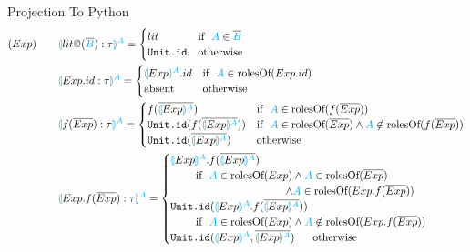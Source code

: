 \documentclass[11pt]{jarticle}
\newcommand{\projection}[2]{{\color{cyan}\llparenthesis}#1{\color{cyan}\rrparenthesis^#2}}
\newcommand{\gray}[1]{\textbf{\textsf{\color{Gray}#1}}}
\begin{document}
Projection To Python
\begin{alignat*}{2}
  &(Exp)~~~ &&\projection{lit\gray{@}(\overline{\color{cyan}{B}}):\tau}{A}=
  \begin{cases}
    lit & \text{if}~~ {\color{cyan}A} \in \overline{\color{cyan}{B}}\\
    \texttt{Unit.id} &\text{otherwise}
  \end{cases}\\
  &&&\projection{Exp.id:\tau}{A}=
  \begin{cases}
    \projection{Exp}{A}.id &\text{if}~~{\color{cyan}A} \in \text{rolesOf} (Exp.id)\\
    \text{absent} &\text{otherwise}
  \end{cases}\\
  &&&\projection{f(\overline{Exp}):\tau}{A} =
  \begin{cases}
    f(\overline{\projection{Exp}{A}}) &\text{if}~~ {\color{cyan}A} \in \text{rolesOf} (f(\overline{Exp}))\\
    \texttt{Unit.id}(f(\overline{\projection{Exp}{A}})) &\text{if}~~ {\color{cyan}A} \in \text{rolesOf}(\overline{Exp}) \wedge {\color{cyan}A} \notin \text{rolesOf} (f(\overline{Exp}))\\
    \texttt{Unit.id}(\overline{\projection{Exp}{A}}) &\text{otherwise}
  \end{cases}\\
  &&&\projection{Exp.f(\overline{Exp}):\tau}{A}=
  \begin{cases}
    \projection{Exp}{A}.f(\overline{\projection{Exp}{A}}) \\
    ~~~~~~~\text{if}~~ {\color{cyan}A} \in \text{rolesOf}(Exp) \wedge {\color{cyan}A} \in \text{rolesOf}(\overline{Exp})\\
    ~~~~~~~~~~~~~~~~~~~~~~~~~~~~~~~~ \wedge {\color{cyan}A} \in \text{rolesOf}(Exp.f(\overline{Exp}))\\
    \texttt{Unit.id}(\projection{Exp}{A}.f(\overline{\projection{Exp}{A}})) \\
    ~~~~~~~\text{if}~~ {\color{cyan}A} \in \text{rolesOf}(Exp) \wedge {\color{cyan}A} \notin \text{rolesOf}(Exp.f(\overline{Exp}))\\
    \texttt{Unit.id}(\projection{Exp}{A},\overline{\projection{Exp}{A}}) ~~~~~\text{otherwise}
  \end{cases}\\

\end{alignat*}
\end{document}
